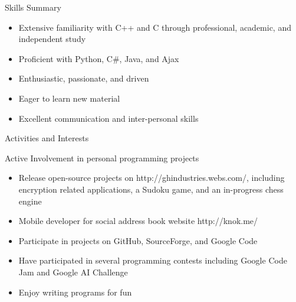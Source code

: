 \documentclass[11pt]{article}
\begin{document}
	\begin{section}{Skills Summary}

		\begin{itemize}
			\item Extensive familiarity with C++ and C through professional, academic, and independent study
			\item Proficient with Python, C\#, Java, and Ajax
			\item Enthusiastic, passionate, and driven
			\item Eager to learn new material
            \item Excellent communication and inter-personal skills
		\end{itemize}

	\end{section}

	\begin{section}{Activities and Interests} \\ %

		\begin{bf}Active Involvement in personal programming projects\end{bf}

		\begin{itemize}
			\item Release open-source projects on http://ghindustries.webs.com/, including encryption related applications, a Sudoku game, and an in-progress chess engine
            \item Mobile developer for social address book website http://knok.me/
            \item Participate in projects on GitHub, SourceForge, and Google Code
            \item Have participated in several programming contests including Google Code Jam and Google AI Challenge
			\item Enjoy writing programs for fun
		\end{itemize}

	\end{section}
\end{document}
